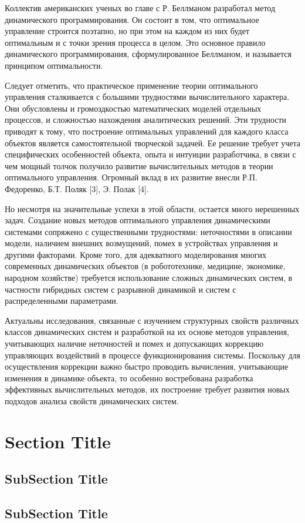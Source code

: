 Коллектив американских ученых во главе с Р. Беллманом разработал метод динамического программирования. Он состоит в том, что оптимальное управление строится поэтапно, но при этом на каждом из них будет оптимальным и с точки зрения процесса в целом. Это основное правило динамического программирования, сформулированное Беллманом, и называется принципом оптимальности.


Следует отметить, что практическое применение теории оптимального управления сталкивается с большими трудностями вычислительного характера. Они обусловлены и громоздкостью математических моделей отдельных процессов, и сложностью нахождения аналитических решений. Эти трудности приводят к тому, что построение оптимальных управлений для каждого класса объектов является самостоятельной творческой задачей. Ее решение требует учета специфических особенностей объекта, опыта и интуиции разработчика, в связи с чем мощный толчок получило развитие вычислительных методов в теории оптимального управления. Огромный вклад в их развитие внесли Р.П. Федоренко, Б.Т. Поляк [3], Э. Полак [4]. 


Но несмотря на значительные успехи в этой области, остается много нерешенных задач. Создание новых методов оптимального управления динамическими системами сопряжено с существенными трудностями: неточностями в описании модели, наличием внешних возмущений, помех в устройствах управления и другими факторами. Кроме того, для адекватного моделирования многих современных динамических объектов (в робототехнике, медицине, экономике, народном хозяйстве) требуется использование сложных динамических систем, в частности гибридных систем с разрывной динамикой и систем с распределенными параметрами.


Актуальны исследования, связанные с изучением структурных свойств различных классов динамических систем и разработкой на их основе методов управления, учитывающих наличие неточностей и помех и допускающих коррекцию управляющих воздействий в процессе функционирования системы. Поскольку для осуществления коррекции важно быстро проводить вычисления, учитывающие изменения в динамике объекта, то особенно востребована разработка эффективных вычислительных методов, их построение требует развития новых подходов анализа свойств динамических систем.




\section{Section Title}



\subsection{SubSection Title}


\subsection{SubSection Title}
